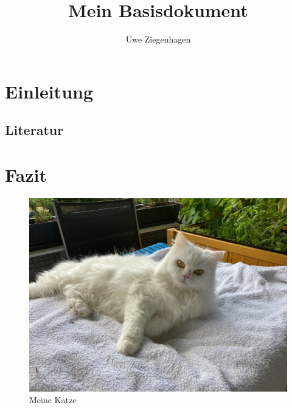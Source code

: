 \documentclass[12pt,ngerman,parskip=half]{scrreprt}
\author{Uwe Ziegenhagen}
\title{Mein Basisdokument}
\begin{document}
\maketitle

\tableofcontents

\listoffigures

\chapter{Einleitung}

\section{Literatur}

\blindtext[2]

\blindtext[2]

\chapter{Fazit}

\begin{figure}[h]
\includegraphics[width=\textwidth]{./Bilder/Katze1.jpg}
\caption{Meine Katze}
\end{figure}
\end{document}
